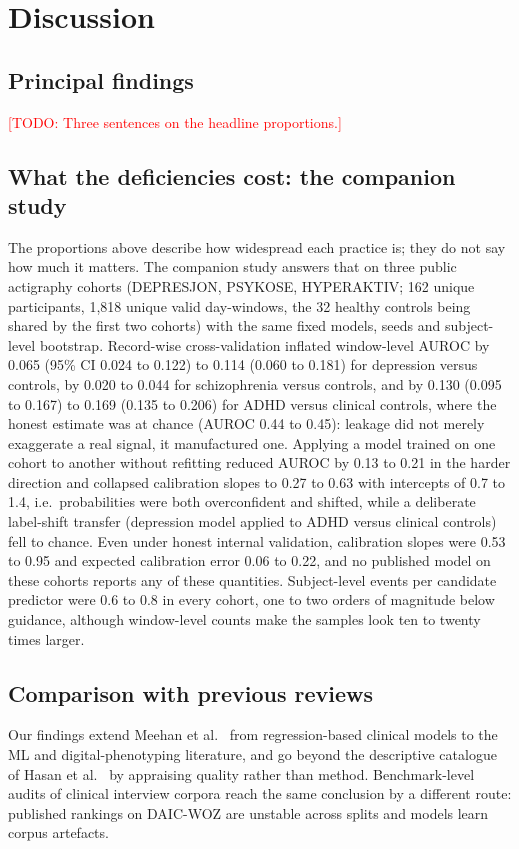\documentclass[11pt,a4paper]{article}
\newcommand{\todo}[1]{\textcolor{red}{[TODO: #1]}}
\begin{document}
\section{Discussion}
\subsection{Principal findings}
\todo{Three sentences on the headline proportions.}

\subsection{What the deficiencies cost: the companion study}
The proportions above describe how widespread each practice is; they do not say how much it
matters. The companion study \cite{paperB} answers that on three public actigraphy cohorts
(DEPRESJON, PSYKOSE, HYPERAKTIV; 162 unique participants, 1{,}818 unique valid day-windows, the 32 healthy controls being shared by the first two cohorts) with the same
fixed models, seeds and subject-level bootstrap. Record-wise cross-validation inflated window-level
AUROC by 0.065 (95\% CI 0.024 to 0.122) to 0.114 (0.060 to 0.181) for depression versus controls,
by 0.020 to 0.044 for schizophrenia versus controls, and by 0.130 (0.095 to 0.167) to 0.169
(0.135 to 0.206) for ADHD versus clinical controls, where the honest estimate was at chance
(AUROC 0.44 to 0.45): leakage did not merely exaggerate a real signal, it manufactured one.
Applying a model trained on one cohort to another without refitting reduced AUROC by 0.13 to 0.21
in the harder direction and collapsed calibration slopes to 0.27 to 0.63 with intercepts of
0.7 to 1.4, i.e.\ probabilities were both overconfident and shifted, while a deliberate label-shift
transfer (depression model applied to ADHD versus clinical controls) fell to chance. Even under
honest internal validation, calibration slopes were 0.53 to 0.95 and expected calibration error
0.06 to 0.22, and no published model on these cohorts reports any of these quantities. Subject-level
events per candidate predictor were 0.6 to 0.8 in every cohort, one to two orders of magnitude
below guidance, although window-level counts make the samples look ten to twenty times larger.

\subsection{Comparison with previous reviews}
Our findings extend Meehan et al.\ \cite{meehan2022} from regression-based clinical models to the
ML and digital-phenotyping literature, and go beyond the descriptive catalogue of Hasan et al.\
\cite{hasan2026} by appraising quality rather than method. Benchmark-level audits of clinical
interview corpora \cite{daicaudit2026,daicinvalid2025} reach the same conclusion by a different
route: published rankings on DAIC-WOZ are unstable across splits and models learn corpus artefacts.
\end{document}
